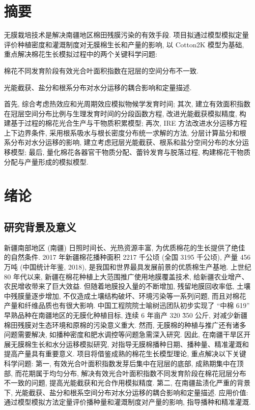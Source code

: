 \documentclass[a4paper,zihao=5]{ctexbook}
\begin{document}

\chapter*{摘要}
无膜栽培技术是解决南疆地区棉田残膜污染的有效手段.
项目拟通过模型模拟定量评价种植密度和灌溉制度对无膜棉生长和产量的影响,
以 Cotton2K 模型为基础, 重点解决棉花生长模拟过程中的两个关键科学问题:
\begin{enumerate*}
    \item 棉花不同发育阶段有效光合叶面积指数在冠层的空间分布不一致.
    \item 光能截获、盐分和根系分布对水分运移的耦合影响和定量描述.
\end{enumerate*}
首先, 综合考虑热效应和光周期效应模拟物候学发育时间;
其次, 建立有效面积指数在冠层空间分布比例与生理发育时间的分段函数方程, 改进光能截获模拟精度, 构建基于过程的棉花光合生产与干物质积累模型;
再次, IRE 方法改进水分运移方程上下边界条件, 采用根系吸水与根长密度分布统一求解的方法, 分层计算盐分和根系分布对水分运移的影响, 建立考虑冠层光能截获、根系和盐分空间分布的水分运移模型;
最后, 量化棉花各器官干物质分配、蕾铃发育与脱落过程, 构建棉花干物质分配与产量形成的模拟模型.

\chapter{绪论}
\section{研究背景及意义}
新疆南部地区 (南疆) 日照时间长、光热资源丰富, 为优质棉花的生长提供了绝佳的自然条件.
2017 年新疆棉花播种面积 2217 千公顷 (全国 3195 千公顷), 产量 456 万吨 (中国统计年鉴, 2018), 是我国和世界最具发展前景的优质棉生产基地.
上世纪 80 年代以来, 新疆在棉花种植上大范围推广使用地膜覆盖技术, 给新疆农业增产、农民增收带来了巨大效益.
但随着地膜投入量的不断增加, 残留地膜回收率低, 土壤中残膜量逐步增加, 不仅造成土壤结构破坏、环境污染等一系列问题, 而且对棉花产量和纤维品质也有很大影响.
中国工程院院士喻树迅团队初步实现了 “中棉 619” 早熟品种在南疆地区的无膜化种植目标, 连续 6 年亩产 320 \~ 350 公斤, 对减少新疆棉田残膜对生态环境和原棉的污染意义重大.
然而, 无膜棉的种植与推广还有诸多问题需要解决, 如播种密度和肥水调控等问题急需深入研究.
因此, 在南疆干旱区开展无膜棉生长和水分运移模拟研究,
对指导无膜棉播种日期、播种量、精准灌溉和提高产量具有重要意义.
项目将借鉴成熟的棉花生长模型理论, 重点解决以下关键科学问题:
第一, 有效光合叶面积指数发芽后集中在冠层的底部, 成熟期集中在顶部, 而花期属于均匀分布, 解决有效光合叶面积指数不同发育阶段在棉花冠层分布不一致的问题, 提高光能截获和光合作用模拟精度.
第二, 在南疆盐渍化严重的背景下, 光能截获、盐分和根系空间分布对水分运移的耦合影响和定量描述.
应用价值: 通过模型模拟方法定量评价播种量和灌溉制度对产量的影响, 指导播种和精准灌溉.
\end{document}

